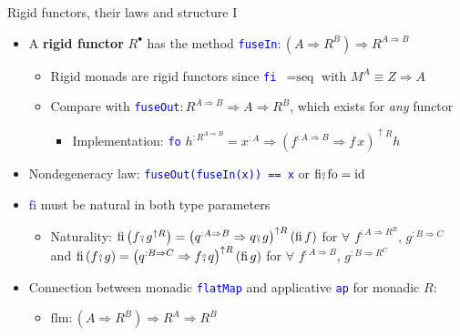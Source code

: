 \documentclass[english]{beamer}
\newcommand{\bef}{\ensuremath\raisebox{2pt}{$\mathsmaller{\mathsmaller{\circ}}$}\hspace{-3.3pt},}
\begin{document}
\begin{frame}{Rigid functors, their laws and structure I}

\begin{itemize}
\item {\footnotesize{}\vspace{-0.1cm}}A \textbf{rigid functor} $R^{\bullet}$
has the method \texttt{\textcolor{blue}{\footnotesize{}fuseIn}}$:\left(A\Rightarrow R^{B}\right)\Rightarrow R^{A\Rightarrow B}$
\begin{itemize}
\item Rigid monads are rigid functors since \texttt{\textcolor{blue}{\footnotesize{}fi
}}$=\text{seq}$ with $M^{A}\equiv Z\Rightarrow A$
\item Compare with \texttt{\textcolor{blue}{\footnotesize{}fuseOut}}$:R^{A\Rightarrow B}\Rightarrow A\Rightarrow R^{B}$,
which exists for \emph{any} functor
\begin{itemize}
\item {\footnotesize{}\vspace{-0.3cm}}Implementation: \texttt{\textcolor{blue}{\footnotesize{}fo}}
$h^{:R^{A\Rightarrow B}}=x^{:A}\Rightarrow\left(f^{:A\Rightarrow B}\Rightarrow f\,x\right)^{\uparrow R}h$
\end{itemize}
\end{itemize}
\item {\footnotesize{}\vspace{-0.05cm}}Nondegeneracy law: \texttt{\textcolor{blue}{\footnotesize{}fuseOut(fuseIn(x))
== x}} or $\text{fi}\bef\text{fo}=\text{id}$
\item \texttt{\textcolor{blue}{\footnotesize{}$\text{fi}$}} must be natural
in both type parameters
\begin{itemize}
\item Naturality: $\text{fi}\left(f\bef g^{\uparrow R}\right)=\left(q^{:A\Rightarrow B}\Rightarrow q\bef g\right)^{\uparrow R}\left(\text{fi}\,f\right)$
for $\forall$ $f^{:A\Rightarrow R^{B}}$, $g^{:B\Rightarrow C}$
and $\text{fi}\left(f\bef g\right)=\left(q^{:B\Rightarrow C}\Rightarrow f\bef q\right)^{\uparrow R}\left(\text{fi}\,g\right)$
for $\forall$ $f^{:A\Rightarrow B}$, $g^{:B\Rightarrow R^{C}}$
\end{itemize}
\item {\small{}Connection between monadic }\texttt{\textcolor{blue}{\footnotesize{}flatMap}}
and applicative \texttt{\textcolor{blue}{\footnotesize{}ap}} for monadic
$R$:
\begin{itemize}
\item {\footnotesize{}$\text{flm}:\left(A\Rightarrow R^{B}\right)\Rightarrow R^{A}\Rightarrow R^{B}$}{\footnotesize\par}

\end{itemize}
\end{itemize}
\end{frame}
\end{document}
